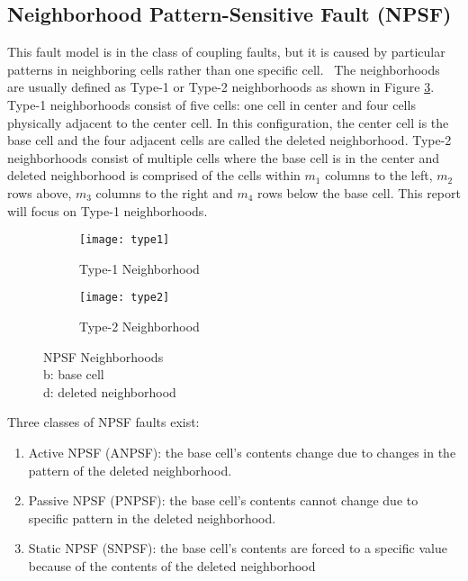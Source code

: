\subsection{Neighborhood Pattern-Sensitive Fault (NPSF)}
\label{sec:npsf}
This fault model is in the class of coupling faults, but it is caused by particular patterns in neighboring cells rather than one specific cell.  The neighborhoods are usually defined as Type-1 or Type-2 neighborhoods \cite{1047051} as shown in Figure \ref{fig:npsftypes}.  Type-1 neighborhoods consist of five cells: one cell in center and four cells physically adjacent to the center cell.  In this configuration, the center cell is the base cell and the four adjacent cells are called the deleted neighborhood.  Type-2 neighborhoods consist of multiple cells where the base cell is in the center and deleted neighborhood is comprised of the cells within $m_1$ columns to the left, $m_2$ rows above, $m_3$ columns to the right and $m_4$ rows below the base cell.  This report will focus on Type-1 neighborhoods.

\begin{figure}[h!]
  \centering
  \begin{subfigure}[b]{0.4\textwidth}
    \texttt{[image: type1]}
    \caption{Type-1 Neighborhood}
    \label{fig:type1}
  \end{subfigure}
  \begin{subfigure}[b]{0.4\textwidth}
    \texttt{[image: type2]}
    \caption{Type-2 Neighborhood}
    \label{fig:type2}
  \end{subfigure}
  \caption{NPSF Neighborhoods \\
           b: base cell \\
           d: deleted neighborhood} 
  \label{fig:npsftypes}
\end{figure}

Three classes of NPSF faults exist:
\begin{enumerate}
  \item Active NPSF (ANPSF): the base cell's contents change due to changes in the pattern of the deleted neighborhood.
  \item Passive NPSF (PNPSF): the base cell's contents cannot change due to specific pattern in the deleted neighborhood.
  \item Static NPSF (SNPSF): the base cell's contents are forced to a specific value because of the contents of the deleted neighborhood
\end{enumerate}

